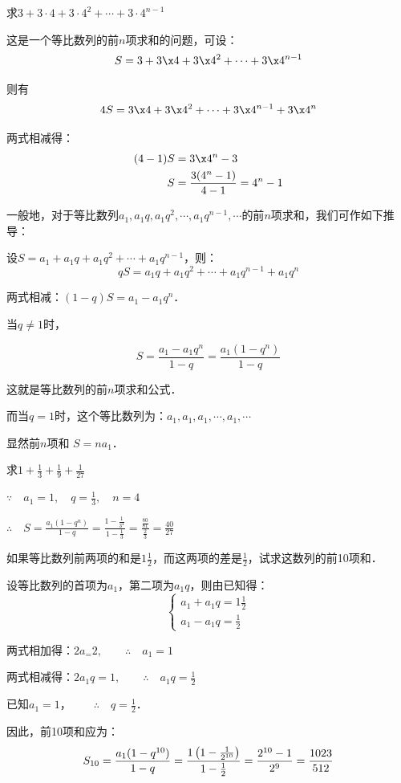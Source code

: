 \begin{example}
求$3+3\cdot 4+3\cdot 4^2+\cdots+3\cdot 4^{n-1}$
\end{example}
    
\begin{solution}
这是一个等比数列的前$n$项求和的问题，可设：$$S=3+3\x4+3\x4^2+\cdots+3\x4^{n-1}$$

则有
\[4S=3\x4+3\x4^2+\cdots+3\x4^{n-1}+3\x4^n\]

两式相减得：
\[\begin{split}
    (4-1) S&=3\x4^n-3\\
    S&=\frac{3(4^n-1)}{4-1}=4^n-1
\end{split}\]
\end{solution}

一般地，对于等比数列$a_1,a_1q,a_1q^2,\cdots,a_1q^{n-1},\cdots$的前$n$项求和，我们可作如下推导：

设$S=a_1+a_1q+a_1q^2+\cdots+a_1q^{n-1}$，则：
\[qS=a_1q+a_1q^2+\cdots+a_1q^{n-1}+a_1q^n\]


两式相减：$(1-q)S=a_1-a_1q^n$．

当$q\ne 1$时，
\begin{blk}{}
\[S=\frac{a_1-a_1q^n}{1-q}=\frac{a_1(1-q^n)}{1-q}\]
\end{blk}
这就是等比数列的前$n$项求和公式．

而当$q=1$时，这个等比数列为：$a_1,a_1,a_1,\cdots,a_1,\cdots$

显然前$n$项和 $S=na_1$．

\begin{example}
    求$1+\frac{1}{3}+\frac{1}{9}+\frac{1}{27}$
\end{example}

\begin{solution}
    $\because\quad a_1=1,\quad q=\frac{1}{3},\quad n=4$

    $\therefore\quad S=\frac{a_1(1-q^n)}{1-q}=\frac{1-\frac{1}{3^4}}{1-\frac{1}{3}}=\frac{\frac{80}{81}}{\frac{2}{3}}=\frac{40}{27}$
\end{solution}

\begin{example}
    如果等比数列前两项的和是$1\frac{1}{2}$，而这两项的差是$\frac{1}{2}$，试求这数列的前10项和．    
\end{example}


\begin{solution}
    设等比数列的首项为$a_1$，第二项为$a_1q$，则由已知得：
    \[\begin{cases}
    a_1+a_1q=1\frac{1}{2}\\
    a_1-a_1q=\frac{1}{2}    
    \end{cases}\]

    两式相加得：$2a_=2,\qquad \therefore\quad a_1=1$

    两式相减得：$2a_1q=1,\qquad \therefore\quad a_1q=\frac{1}{2}$

    已知$a_1=1$，$\qquad \therefore\quad q=\frac{1}{2}$．

    因此，前10项和应为：
\[
    S_{10}=\frac{a_1(1-q^{10})}{1-q}
    =\frac{1\left(1-\frac{1}{2^{10}}\right)}{1-\frac{1}{2}}\\
    =\frac{2^{10}-1}{2^9}=\frac{1023}{512}
\]
\end{solution}


